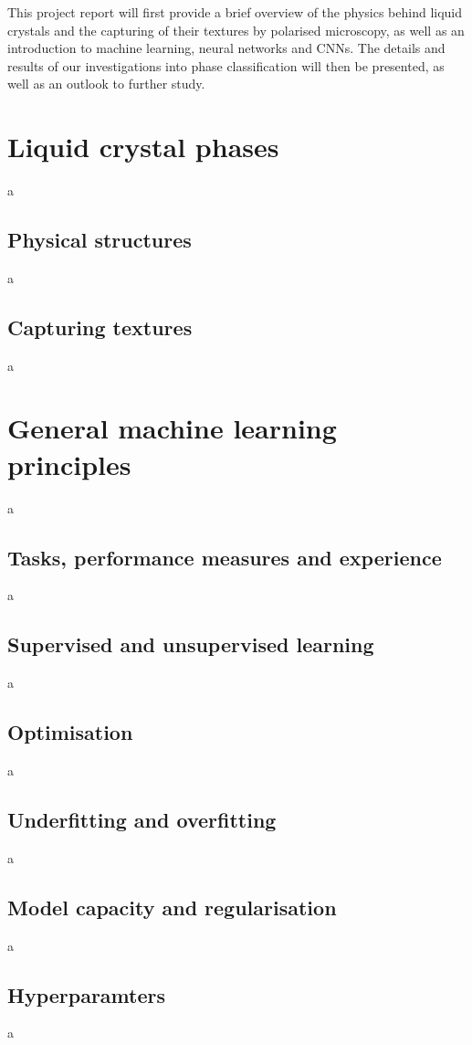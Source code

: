 \documentclass[12pt]{article}
\begin{document}
This project report will first provide a brief overview of the physics behind liquid crystals and the capturing of their textures by polarised microscopy, as well as an introduction to machine learning, neural networks and CNNs. The details and results of our investigations into phase classification will then be presented, as well as an outlook to further study.
\section{Liquid crystal phases}
a
\subsection{Physical structures}
a
\subsection{Capturing textures}
a
\section{General machine learning principles}
a
\subsection{Tasks, performance measures and experience}
a
\subsection{Supervised and unsupervised learning}
a
\subsection{Optimisation}
a
\subsection{Underfitting and overfitting}
a
\subsection{Model capacity and regularisation}
a
\subsection{Hyperparamters}
a
\end{document}
